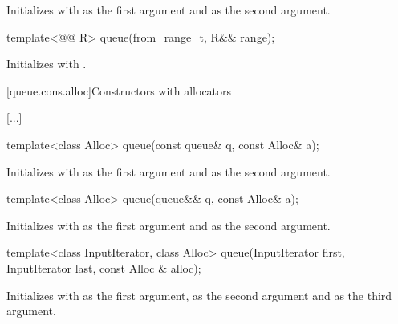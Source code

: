 \documentclass{wg21}
\begin{document}
\begin{itemdescr}
    \pnum
    \effects
    Initializes  with  as the first argument and  as the second argument.
\end{itemdescr}

\begin{addedblock}
\begin{itemdecl}
    template<@@ R>
    queue(from_range_t, R&& range);
\end{itemdecl}

\begin{itemdescr}
    \pnum
    \effects
    Initializes  with .
\end{itemdescr}
\end{addedblock}

[queue.cons.alloc]{Constructors with allocators}

[...]

\begin{itemdecl}
    template<class Alloc> queue(const queue& q, const Alloc& a);
\end{itemdecl}

\begin{itemdescr}
    \pnum
    \effects
    Initializes  with  as the first argument and  as the
    second argument.
\end{itemdescr}

\begin{itemdecl}
    template<class Alloc> queue(queue&& q, const Alloc& a);
\end{itemdecl}

\begin{itemdescr}
    \pnum
    \effects
    Initializes  with  as the first argument and 
    as the second argument.
\end{itemdescr}

\begin{itemdecl}
    template<class InputIterator, class Alloc>
    queue(InputIterator first, InputIterator last, const Alloc & alloc);
\end{itemdecl}

\begin{itemdescr}
    \pnum
    \effects
    Initializes  with  as the first argument,  as the second argument and  as the third argument.
\end{itemdescr}
\end{document}
